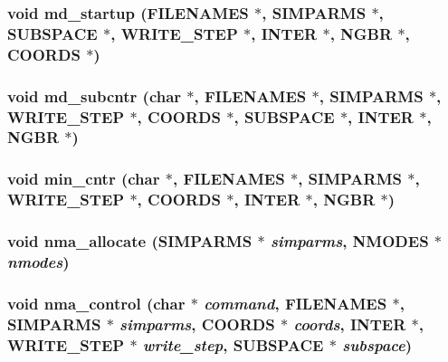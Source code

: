 \subsubsection{\setlength{\rightskip}{0pt plus 5cm}void md\_\-startup ({\bf FILENAMES} $\ast$, {\bf SIMPARMS} $\ast$, {\bf SUBSPACE} $\ast$, {\bf WRITE\_\-STEP} $\ast$, {\bf INTER} $\ast$, {\bf NGBR} $\ast$, {\bf COORDS} $\ast$)}\label{proto__main_8h_d441895cdc037c81d99f708981142f36}


\subsubsection{\setlength{\rightskip}{0pt plus 5cm}void md\_\-subcntr (char $\ast$, {\bf FILENAMES} $\ast$, {\bf SIMPARMS} $\ast$, {\bf WRITE\_\-STEP} $\ast$, {\bf COORDS} $\ast$, {\bf SUBSPACE} $\ast$, {\bf INTER} $\ast$, {\bf NGBR} $\ast$)}\label{proto__main_8h_2d41ae9b1f6a1c06ed61e0d49feef9b2}


\subsubsection{\setlength{\rightskip}{0pt plus 5cm}void min\_\-cntr (char $\ast$, {\bf FILENAMES} $\ast$, {\bf SIMPARMS} $\ast$, {\bf WRITE\_\-STEP} $\ast$, {\bf COORDS} $\ast$, {\bf INTER} $\ast$, {\bf NGBR} $\ast$)}\label{proto__main_8h_24dd289c53738562f1de1e81d5cb4a96}


\subsubsection{\setlength{\rightskip}{0pt plus 5cm}void nma\_\-allocate ({\bf SIMPARMS} $\ast$ {\em simparms}, {\bf NMODES} $\ast$ {\em nmodes})}\label{proto__main_8h_7882405e314f23b52ec5c9973c6fa513}


\subsubsection{\setlength{\rightskip}{0pt plus 5cm}void nma\_\-control (char $\ast$ {\em command}, {\bf FILENAMES} $\ast$, {\bf SIMPARMS} $\ast$ {\em simparms}, {\bf COORDS} $\ast$ {\em coords}, {\bf INTER} $\ast$, {\bf WRITE\_\-STEP} $\ast$ {\em write\_\-step}, {\bf SUBSPACE} $\ast$ {\em subspace})}\label{proto__main_8h_7c0bc0675476031e28b757427bb1d740}


